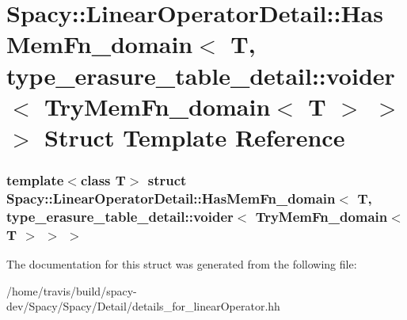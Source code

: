 \hypertarget{structSpacy_1_1LinearOperatorDetail_1_1HasMemFn__domain_3_01T_00_01type__erasure__table__detail_77d8652a1c2d860c369ae6c9bd4b7663}{\section{\-Spacy\-:\-:\-Linear\-Operator\-Detail\-:\-:\-Has\-Mem\-Fn\-\_\-domain$<$ \-T, type\-\_\-erasure\-\_\-table\-\_\-detail\-:\-:voider$<$ \-Try\-Mem\-Fn\-\_\-domain$<$ \-T $>$ $>$ $>$ \-Struct \-Template \-Reference}
\label{structSpacy_1_1LinearOperatorDetail_1_1HasMemFn__domain_3_01T_00_01type__erasure__table__detail_77d8652a1c2d860c369ae6c9bd4b7663}
}
\subsubsection*{template$<$class T$>$ struct Spacy\-::\-Linear\-Operator\-Detail\-::\-Has\-Mem\-Fn\-\_\-domain$<$ T, type\-\_\-erasure\-\_\-table\-\_\-detail\-::voider$<$ Try\-Mem\-Fn\-\_\-domain$<$ T $>$ $>$ $>$}



\-The documentation for this struct was generated from the following file\-:\begin{DoxyCompactItemize}
\item 
/home/travis/build/spacy-\/dev/\-Spacy/\-Spacy/\-Detail/details\-\_\-for\-\_\-linear\-Operator.\-hh\end{DoxyCompactItemize}
